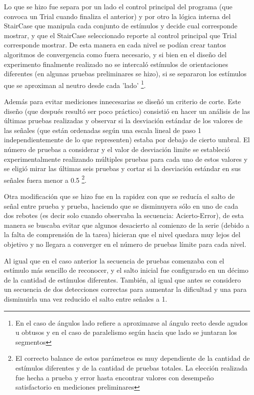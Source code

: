 \documentclass{article}
\numberwithin{figure}{section}
\begin{document}
    Lo que se hizo fue separa por un lado el control principal del programa (que convoca un Trial cuando finaliza el anterior) y por otro la lógica interna del StairCase que manipula cada conjunto de estímulos y decide cual corresponde mostrar, y que el StairCase seleccionado reporte al control principal que Trial corresponde mostrar. De esta manera en cada nivel se podían crear tantos algoritmos de convergencia como fuera necesario, y si bien en el diseño del experimento finalmente realizado no se intercaló estímulos de orientaciones diferentes (en algunas pruebas preliminares se hizo), si se separaron los estímulos que se aproximan al neutro desde cada 'lado' \footnote{En el caso de ángulos lado refiere a aproximarse al ángulo recto desde agudos u obtusos y en el caso de paralelismo según hacia que lado se juntaran los segmentos}.
    
    Además para evitar mediciones innecesarias se diseñó un criterio de corte. Este diseño (que después resultó ser poco práctico) consistió en hacer un análisis de las últimas pruebas realizadas y observar si la desviación estándar de los valores de las señales (que están ordenadas según una escala lineal de paso 1 independientemente de lo que representen) estaba por debajo de cierto umbral. El número de pruebas a considerar y el valor de desviación limite se estableció experimentalmente realizando múltiples pruebas para cada uno de estos valores y se eligió mirar las últimas seis pruebas y cortar si la desviación estándar en sus señales fuera menor a 0.5 \footnote{El correcto balance de estos parámetros es muy dependiente de la cantidad de estímulos diferentes y de la cantidad de pruebas totales. La elección realizada fue hecha a prueba y error hasta encontrar valores con desempeño satisfactorio en mediciones preliminares}. 
    
    Otra modificación que se hizo fue en la rapidez con que se reducía el salto de señal entre prueba y prueba, haciendo que se disminuyera sólo en uno de cada dos rebotes (es decir solo cuando observaba la secuencia: Acierto-Error), de esta manera se buscaba evitar que algunos desacierto al comienzo de la serie (debido a la falta de comprensión de la tarea) hicieran que el nivel quedara muy lejos del objetivo y no llegara a converger en el número de pruebas límite para cada nivel. 
    
    Al igual que en el caso anterior la secuencia de pruebas comenzaba con el estímulo más sencillo de reconocer, y el salto inicial fue configurado en un décimo de la cantidad de estímulos diferentes. También, al igual que antes se considero un secuencia de dos detecciones correctas para aumentar la dificultad y una para disminuirla una vez reducido el salto entre señales a 1. 
\end{document}
